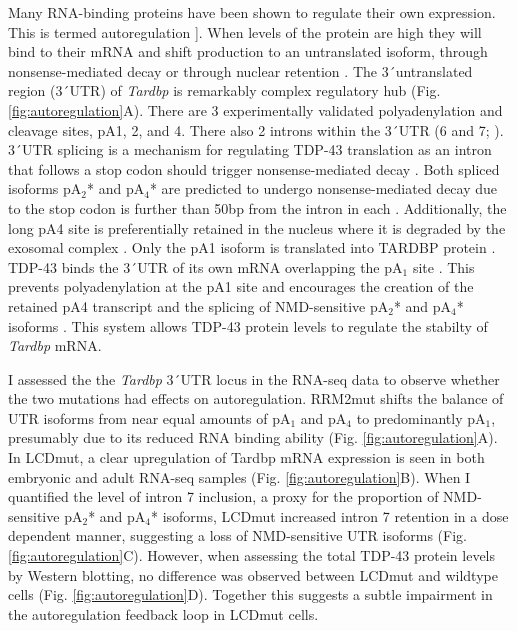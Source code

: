 Many RNA-binding proteins have been shown to regulate their own expression. This is termed autoregulation \citep{Lareau2007,Wollerton2004}]. 
When levels of the protein are high they will bind to their mRNA and shift production to an untranslated isoform, through nonsense-mediated decay \citep{Losson1979, McGlincy2008-wh} or through nuclear retention \citep{Boutz2015}.
The 3\'\ untranslated region (3\'\ UTR) of \textit{Tardbp} is remarkably complex regulatory hub (Fig. \ref{fig:autoregulation}A). 
There are 3 experimentally validated polyadenylation and cleavage sites, pA1, 2, and 4. 
There also 2 introns within the 3\'\ UTR (6 and 7; \citep{Ayala2011,Koyama2016}). 
3\'\ UTR splicing is a mechanism for regulating TDP-43 translation as an intron that follows a stop codon should trigger nonsense-mediated decay \citep{Losson1979} . 
Both spliced isoforms pA$_2$* and pA$_4$* are predicted to undergo nonsense-mediated decay due to the stop codon is further than 50bp from the intron in each \citep{Nagy1998}.
Additionally, the long pA4 site is preferentially retained in the nucleus where it is degraded by the exosomal complex \citep{Ayala2011}.
Only the pA1 isoform is translated into TARDBP protein \citep{Koyama2016}.
TDP-43 binds the 3\'\ UTR of its own mRNA overlapping the pA$_1$ site  \citep{Polymenidou2011,Tollervey2011}.
This prevents polyadenylation at the pA1 site and encourages the creation of the retained pA4 transcript and the splicing of NMD-sensitive pA$_2$* and pA$_4$* isoforms \citep{Koyama2016}. 
This system allows TDP-43 protein levels to regulate the stabilty of \textit{Tardbp} mRNA.

I assessed the the \textit{Tardbp} 3\'\ UTR locus in the RNA-seq data to observe whether the two mutations had effects on autoregulation. 
RRM2mut shifts the balance of UTR isoforms from near equal amounts of pA$_1$ and pA$_4$ to predominantly pA$_1$, presumably due to its reduced RNA binding ability  (Fig. \ref{fig:autoregulation}A).  
In LCDmut, a clear upregulation of Tardbp mRNA expression is seen in both embryonic and adult RNA-seq samples (Fig. \ref{fig:autoregulation}B). 
When I quantified the level of intron 7 inclusion,  a proxy for the proportion of NMD-sensitive pA$_2$* and pA$_4$* isoforms, LCDmut increased intron 7 retention in a dose dependent manner, suggesting a loss of NMD-sensitive UTR isoforms (Fig. \ref{fig:autoregulation}C). 
However, when assessing the total TDP-43 protein levels by Western blotting, no difference was observed between LCDmut and wildtype cells (Fig. \ref{fig:autoregulation}D).
Together this suggests a subtle impairment in the autoregulation feedback loop in LCDmut cells.

